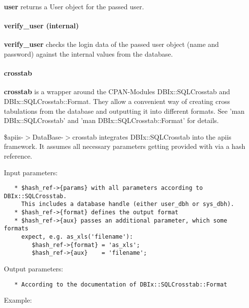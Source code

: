 \textbf{user} returns a User object for the passed user.

\paragraph*{verify\_user (internal)\label{Apiis::DataBase::Init_--_Basic_database_initialisation_verify_user_internal_}}


\textbf{verify\_user} checks the login data of the passed user object (name and
password) against the internal values from the database.

\paragraph*{crosstab\label{Apiis::DataBase::Init_--_Basic_database_initialisation_crosstab}}


\textbf{crosstab} is a wrapper around the CPAN-Modules DBIx::SQLCrosstab and
DBIx::SQLCrosstab::Format. They allow a convenient way of creating
cross tabulations from the database and outputting it into different formats.
See 'man DBIx::SQLCrosstab' and 'man DBIx::SQLCrosstab::Format' for details.



\$apiis-$>$DataBase-$>$crosstab integrates DBIx::SQLCrosstab into the apiis
framework. It assumes all necessary parameters getting provided with via a
hash reference.



Input parameters:

\begin{verbatim}
   * $hash_ref->{params} with all parameters according to DBIx::SQLCrosstab.
     This includes a database handle (either user_dbh or sys_dbh).
   * $hash_ref->{format} defines the output format
   * $hash_ref->{aux} passes an additional parameter, which some formats
     expect, e.g. as_xls('filename'):
        $hash_ref->{format} = 'as_xls';
        $hash_ref->{aux}    = 'filename';
\end{verbatim}


Output parameters:

\begin{verbatim}
   * According to the documentation of DBIx::SQLCrosstab::Format
\end{verbatim}


Example:

